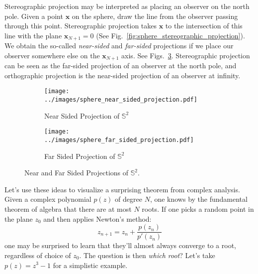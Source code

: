 \documentclass{article}
\theoremstyle{plain}
\theoremstyle{normal}
\begin{document}
        Stereographic projection may be interpreted as placing an observer on
        the north pole. Given a point $\mathbf{x}$ on the sphere, draw the line
        from the observer passing through this point. Stereographic projection
        takes $\mathbf{x}$ to the intersection of this line with the plane
        $\mathbf{x}_{N+1}=0$ (See
        Fig.~\ref{fig:sphere_stereographic_projection}). We obtain the so-called
        \textit{near-sided} and \textit{far-sided} projections if we place our
        observer somewhere else on the $\mathbf{x}_{N+1}$ axis.
        See Figs.~\ref{fig:near_and_far_sided_projections}. Stereographic
        projection can be seen as the far-sided projection of an observer at
        the north pole, and orthographic projection is the near-sided projection
        of an observer at infinity.
        \begin{figure}
            \centering
            \begin{subfigure}[b]{0.49\textwidth}
                \centering
                \texttt{[image: ../images/sphere\_near\_sided\_projection.pdf]}
                \caption{Near Sided Projection of $\mathbb{S}^{2}$}
                \label{fig:sphere_near_sided_projection}
            \end{subfigure}
            \hfill
            \begin{subfigure}[b]{0.49\textwidth}
                \centering
                \texttt{[image: ../images/sphere\_far\_sided\_projection.pdf]}
                \caption{Far Sided Projection of $\mathbb{S}^{2}$}
                \label{fig:sphere_far_sided_projection}
            \end{subfigure}
            \caption{Near and Far Sided Projections of $\mathbb{S}^{2}$.}
            \label{fig:near_and_far_sided_projections}
        \end{figure}
        Let's use these ideas to visualize a surprising theorem from complex
        analysis. Given a complex polynomial $p(z)$ of degree $N$, one knows by
        the fundamental theorem of algebra that there are at most $N$ roots.
        If one picks a random point in the plane $z_{0}$ and then applies
        Newton's method:
        \begin{equation}
            z_{n+1}=z_{n}+\frac{p(z_{n})}{p'(z_{n})}
        \end{equation}
        one may be surprised to learn that they'll almost always converge to a
        root, regardless of choice of $z_{0}$. The question is then
        \textit{which root}? Let's take $p(z)=z^{3}-1$ for a simplistic example.
\end{document}

